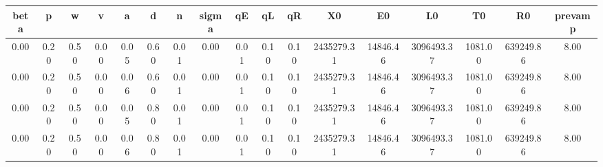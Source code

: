 \begin{tiny}\begin{tabular}{|c|c|c|c|c|c|c|c|c|c|c|c|c|c|c|c|c|}
\hline
\textbf{beta}&\textbf{p}&\textbf{w}&\textbf{v}&\textbf{a}&\textbf{d}&\textbf{n}&\textbf{sigma}&\textbf{qE}&\textbf{qL}&\textbf{qR}&\textbf{X0}&\textbf{E0}&\textbf{L0}&\textbf{T0}&\textbf{R0}&\textbf{prevamp}\\\hline
0.00&0.20&0.50&0.00&0.05&0.60&0.01&0.00&0.01&0.10&0.10&2435279.31&14846.46&3096493.37&1081.00&639249.86&8.00\\\hline
0.00&0.20&0.50&0.00&0.06&0.60&0.01&0.00&0.01&0.10&0.10&2435279.31&14846.46&3096493.37&1081.00&639249.86&8.00\\\hline
0.00&0.20&0.50&0.00&0.05&0.80&0.01&0.00&0.01&0.10&0.10&2435279.31&14846.46&3096493.37&1081.00&639249.86&8.00\\\hline
0.00&0.20&0.50&0.00&0.06&0.80&0.01&0.00&0.01&0.10&0.10&2435279.31&14846.46&3096493.37&1081.00&639249.86&8.00\\\hline
\end{tabular}
\end{tiny}